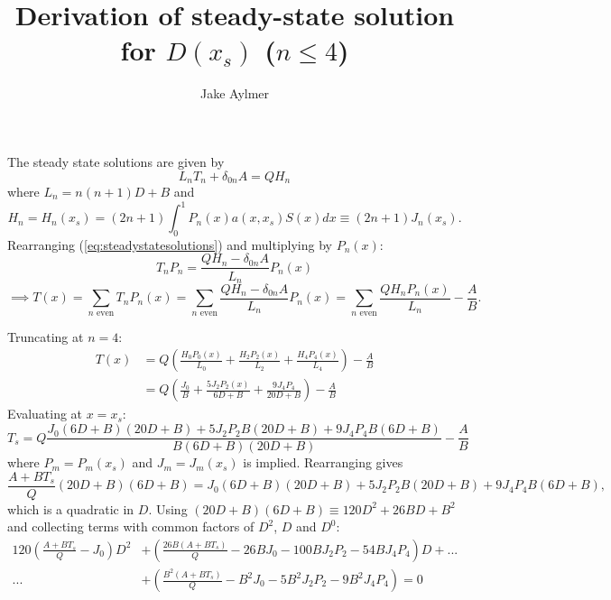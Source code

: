 \documentclass[12pt]{article}
\begin{document}
\thispagestyle{empty}

\title{Derivation of steady-state solution for $D(x_s)$ ($n\leq 4$)}
\author{Jake Aylmer}
\maketitle

\normalsize
\noindent
The steady state solutions are given by
\begin{equation}\label{eq:steadystatesolutions}
L_nT_n + \delta_{0n}A = QH_n
\end{equation}
where $L_n = n(n+1)D+B$ and
\begin{equation}\label{eq:Hn}
H_n = H_n(x_s) = (2n+1)\int_0^1 P_n(x)a(x,x_s)S(x)dx \equiv (2n+1)J_n(x_s).
\end{equation}
Rearranging (\ref{eq:steadystatesolutions}) and multiplying by $P_n(x)$:
\begin{equation}\label{rearrange1}
T_nP_n = \frac{QH_n - \delta_{0n}A}{L_n}P_n(x)
\end{equation}
\begin{equation}\label{eq:takesum}
\implies T(x) = \sum_{n\textrm{ even}} T_nP_n(x) = \sum_{n\textrm{ even}}\frac{QH_n - \delta_{0n}A}{L_n}P_n(x) = \sum_{n\textrm{ even}}\frac{QH_nP_n(x)}{L_n} - \frac{A}{B}.
\end{equation}

\noindent
Truncating at $n=4$:
\begin{align*}\label{eq:truncate}
T(x) &= Q\left( \frac{H_0P_0(x)}{L_0} + \frac{H_2P_2(x)}{L_2} + \frac{H_4P_4(x)}{L_4}\right) - \frac{A}{B} \\
&= Q\left(\frac{J_0}{B} + \frac{5J_2P_2(x)}{6D+B} + \frac{9J_4P_4}{20D+B}\right) - \frac{A}{B}
\end{align*}
Evaluating at $x=x_s$:
\begin{equation*}
T_s = Q \frac{J_0(6D+B)(20D+B) + 5J_2P_2B(20D+B) + 9J_4P_4B(6D+B)}{B(6D+B)(20D+B)} - \frac{A}{B}
\end{equation*}
where $P_m = P_m(x_s)$ and $J_m = J_m(x_s)$ is implied. Rearranging gives
\begin{equation*}
\frac{A+BT_s}{Q}(20D+B)(6D+B) = J_0(6D+B)(20D+B) + 5J_2P_2B(20D+B) + 9J_4P_4B(6D+B),
\end{equation*}
which is a quadratic in $D$. Using $(20D+B)(6D+B) \equiv 120D^2 + 26BD + B^2$ and collecting terms with common factors of $D^2$, $D$ and $D^0$:
\begin{align*}
120\left( \frac{A+BT_s}{Q} - J_0 \right) D^2 &+ \left( \frac{26B(A+BT_s)}{Q} - 26BJ_0 - 100BJ_2P_2 - 54BJ_4P_4 \right) D + ... \\
... &+ \left( \frac{B^2(A+BT_s)}{Q} - B^2J_0 - 5B^2J_2P_2 - 9B^2J_4P_4 \right) = 0
\end{align*}
\end{document}
